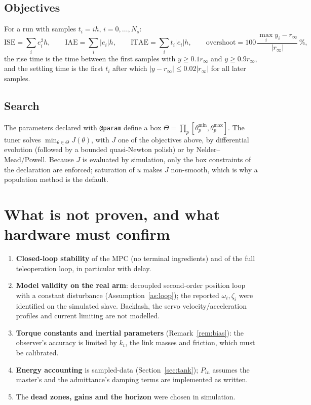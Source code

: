 \documentclass[11pt,a4paper]{article}
\theoremstyle{remark}
\theoremstyle{definition}
\begin{document}
\subsection{Objectives}
For a run with samples $t_i=ih$, $i=0,\dots,N_s$:
\[
\mathrm{ISE}=\sum_ie_i^2h,\qquad \mathrm{IAE}=\sum_i|e_i|h,\qquad \mathrm{ITAE}=\sum_it_i|e_i|h,\qquad \text{overshoot}=100\,\frac{\max_iy_i-r_\infty}{|r_\infty|}\,\%,
\]
the rise time is the time between the first samples with $y\ge0.1r_\infty$ and $y\ge0.9r_\infty$, and the settling time is the first $t_i$ after which $|y-r_\infty|\le0.02|r_\infty|$ for all later samples.

\subsection{Search}
The parameters declared with \texttt{@param} define a box $\Theta=\prod_p[\theta_p^{\min},\theta_p^{\max}]$. The tuner solves $\min_{\theta\in\Theta}J(\theta)$, with $J$ one of the objectives above, by differential
evolution \cite{storn1997de} (followed by a bounded quasi-Newton polish) or by Nelder--Mead/Powell. Because $J$ is evaluated by simulation, only the box constraints of the declaration are enforced;
saturation of $u$ makes $J$ non-smooth, which is why a population method is the default.

\section{What is not proven, and what hardware must confirm}\label{sec:limits}
\begin{enumerate}[leftmargin=*,itemsep=2pt]
\item \textbf{Closed-loop stability} of the MPC (no terminal ingredients) and of the full teleoperation loop, in particular with delay.
\item \textbf{Model validity on the real arm}: decoupled second-order position loop with a constant disturbance (Assumption~\ref{as:loop}); the reported $\omega_i,\zeta_i$ were identified on the simulated slave.
Backlash, the servo velocity/acceleration profiles and current limiting are not modelled.
\item \textbf{Torque constants and inertial parameters} (Remark~\ref{rem:bias}): the observer's accuracy is limited by $k_t$, the link masses and friction, which must be calibrated.
\item \textbf{Energy accounting} is sampled-data (Section~\ref{sec:tank}); $P_{in}$ assumes the master's and the admittance's damping terms are implemented as written.
\item The \textbf{dead zones, gains and the horizon} were chosen in simulation.
\end{enumerate}
\end{document}

